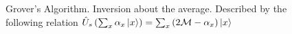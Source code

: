 \begin{figure}
\centering



\caption{Grover's Algorithm. Inversion about
  the average. Described by the following relation 
$\hat{U}_s\left(\sum_x \alpha_x \ket{x}\right) = 
\sum_x \left(2 \mathcal{M} - \alpha_x \right)\ket{x}$}
\label{figQuantCompGroverInvMiddle}
\end{figure}